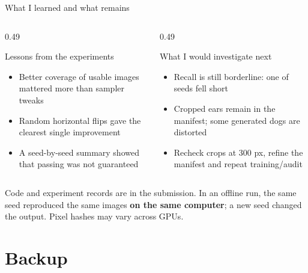 \documentclass[aspectratio=169,10pt,t]{beamer}
\begin{document}
\begin{frame}{What I learned and what remains}
\begin{columns}[T]
\begin{column}{0.49\linewidth}
\begin{block}{Lessons from the experiments}
\small\begin{itemize}\setlength{\itemsep}{2pt}
\item Better coverage of usable images mattered more than sampler tweaks
\item Random horizontal flips gave the clearest single improvement
\item A seed-by-seed summary showed that passing was not guaranteed
\end{itemize}
\end{block}
\end{column}
\begin{column}{0.49\linewidth}
\begin{block}{What I would investigate next}
\small\begin{itemize}\setlength{\itemsep}{2pt}
\item Recall is still borderline: one of \nSeeds{} seeds fell short
\item Cropped ears remain in the manifest; some generated dogs are distorted
\item Recheck crops at 300 px, refine the manifest and repeat training/audit
\end{itemize}
\end{block}
\end{column}
\end{columns}
\vspace{4pt}\centering\small Code and experiment records are in the submission. In an offline run, the same seed reproduced the same images \textbf{on the same computer}; a new seed changed the output. Pixel hashes may vary across GPUs.
\end{frame}

\appendix
\section*{Backup}
\end{document}
